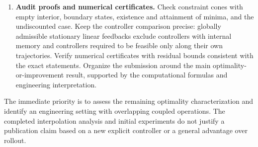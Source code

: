 \documentclass[10pt]{article}
\begin{document}
\begin{enumerate}
\item \textbf{Audit proofs and numerical certificates.}
Check constraint cones with empty interior, boundary states, existence and attainment of minima, and the undiscounted case. Keep the controller comparison precise: globally admissible stationary linear feedbacks exclude controllers with internal memory and controllers required to be feasible only along their own trajectories. Verify numerical certificates with residual bounds consistent with the exact statements. Organize the submission around the main optimality-or-improvement result, supported by the computational formulas and engineering interpretation.
\end{enumerate}

The immediate priority is to assess the remaining optimality characterization and identify an engineering setting with overlapping coupled operations. The completed interpolation analysis and initial experiments do not justify a publication claim based on a new explicit controller or a general advantage over rollout.
\end{document}
